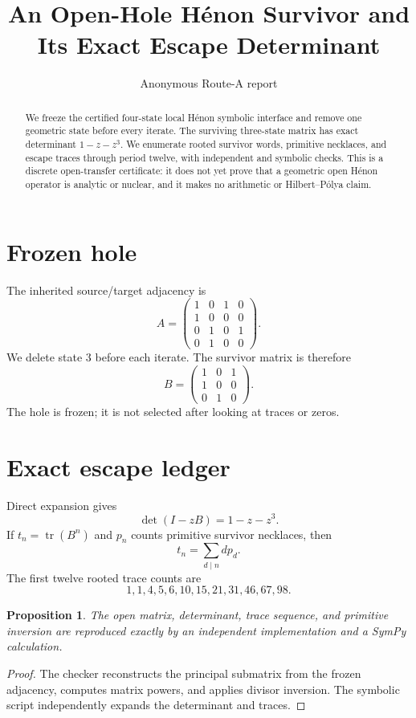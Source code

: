 \documentclass[10pt]{article}
\title{An Open-Hole H\'enon Survivor and Its Exact Escape Determinant}
\author{Anonymous Route-A report}
\date{}
\newtheorem{proposition}{Proposition}
\begin{document}
\maketitle
\begin{abstract}
We freeze the certified four-state local H\'enon symbolic interface and remove
one geometric state before every iterate.  The surviving three-state matrix
has exact determinant $1-z-z^3$.  We enumerate rooted survivor words,
primitive necklaces, and escape traces through period twelve, with independent
and symbolic checks.  This is a discrete open-transfer certificate: it does
not yet prove that a geometric open H\'enon operator is analytic or nuclear,
and it makes no arithmetic or Hilbert--P\'olya claim.
\end{abstract}

\section{Frozen hole}
The inherited source/target adjacency is
\[
A=\begin{pmatrix}1&0&1&0\\1&0&0&0\\0&1&0&1\\0&1&0&0\end{pmatrix}.
\]
We delete state $3$ before each iterate.  The survivor matrix is therefore
\[
B=\begin{pmatrix}1&0&1\\1&0&0\\0&1&0\end{pmatrix}.
\]
The hole is frozen; it is not selected after looking at traces or zeros.

\section{Exact escape ledger}
Direct expansion gives
\[
\det(I-zB)=1-z-z^3.
\]
If $t_n=\operatorname{tr}(B^n)$ and $p_n$ counts primitive survivor necklaces,
then
\[
t_n=\sum_{d\mid n}d p_d.
\]
The first twelve rooted trace counts are
\[
1,1,4,5,6,10,15,21,31,46,67,98.
\]

\begin{proposition}
The open matrix, determinant, trace sequence, and primitive inversion are
reproduced exactly by an independent implementation and a SymPy calculation.
\end{proposition}
\begin{proof}
The checker reconstructs the principal submatrix from the frozen adjacency,
computes matrix powers, and applies divisor inversion.  The symbolic script
independently expands the determinant and traces.
\end{proof}
\end{document}
